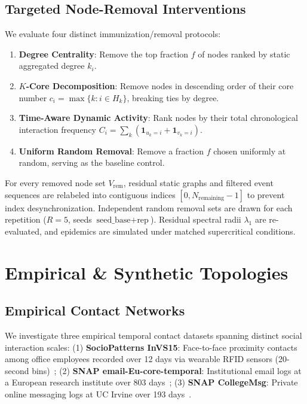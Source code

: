 \documentclass[conference]{IEEEtran}
\begin{document}
\subsection{Targeted Node-Removal Interventions}
We evaluate four distinct immunization/removal protocols:
\begin{enumerate}
    \item \textbf{Degree Centrality}: Remove the top fraction $f$ of nodes ranked by static aggregated degree $k_i$.
    \item \textbf{$K$-Core Decomposition}: Remove nodes in descending order of their core number $c_i = \max \{k : i \in H_k\}$, breaking ties by degree.
    \item \textbf{Time-Aware Dynamic Activity}: Rank nodes by their total chronological interaction frequency $C_i = \sum_{k} (\mathbf{1}_{u_k = i} + \mathbf{1}_{v_k = i})$.
    \item \textbf{Uniform Random Removal}: Remove a fraction $f$ chosen uniformly at random, serving as the baseline control.
\end{enumerate}
For every removed node set $V_{\text{rem}}$, residual static graphs and filtered event sequences are relabeled into contiguous indices $[0, N_{\text{remaining}}-1]$ to prevent index desynchronization. Independent random removal sets are drawn for each repetition ($R=5$, seeds $\text{seed\_base} + \text{rep}$). Residual spectral radii $\lambda_1$ are re-evaluated, and epidemics are simulated under matched supercritical conditions.

\section{Empirical \& Synthetic Topologies}

\subsection{Empirical Contact Networks}
We investigate three empirical temporal contact datasets spanning distinct social interaction scales: (1) \textbf{SocioPatterns InVS15}: Face-to-face proximity contacts among office employees recorded over 12 days via wearable RFID sensors (20-second bins)~\cite{genois2015compensating}; (2) \textbf{SNAP email-Eu-core-temporal}: Institutional email logs at a European research institute over 803 days~\cite{leskovec2007graph}; (3) \textbf{SNAP CollegeMsg}: Private online messaging logs at UC Irvine over 193 days~\cite{panzarasa2009patterns}.
\end{document}
